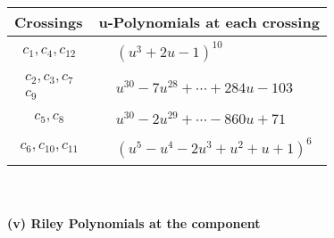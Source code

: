 \documentclass[1p]{elsarticle_modified}
\theoremstyle{definition}
\begin{document}
\begin{tabular}{m{50pt}|m{274pt}}
Crossings & \hspace{64pt}u-Polynomials at each crossing \\
\hline $$\begin{aligned}c_{1},c_{4},c_{12}\end{aligned}$$&$\begin{aligned}
&(u^3+2 u-1)^{10}
\end{aligned}$\\
\hline $$\begin{aligned}c_{2},c_{3},c_{7}\\c_{9}\end{aligned}$$&$\begin{aligned}
&u^{30}-7 u^{28}+\cdots+284 u-103
\end{aligned}$\\
\hline $$\begin{aligned}c_{5},c_{8}\end{aligned}$$&$\begin{aligned}
&u^{30}-2 u^{29}+\cdots-860 u+71
\end{aligned}$\\
\hline $$\begin{aligned}c_{6},c_{10},c_{11}\end{aligned}$$&$\begin{aligned}
&(u^5- u^4-2 u^3+u^2+u+1)^6
\end{aligned}$\\
\hline
\end{tabular}\\~\\
\newpage\renewcommand{\arraystretch}{1}
\flushleft \textbf{(v) Riley Polynomials at the component}\newline \\
\end{document}
